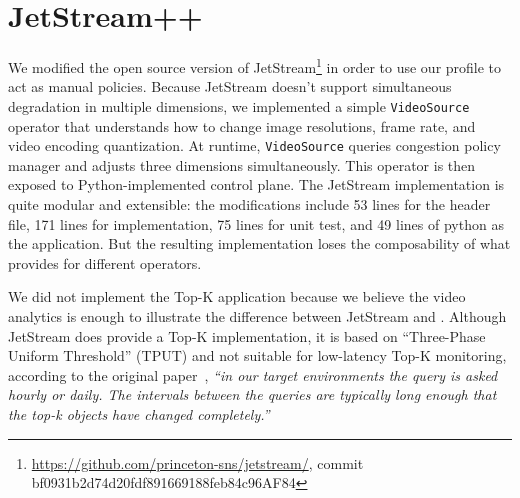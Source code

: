 \section{JetStream++}
\label{appendix:jetstream++}

We modified the open source version of
JetStream\footnote{\url{https://github.com/princeton-sns/jetstream/}, commit
  bf0931b2d74d20fdf891669188feb84c96AF84} in order to use our profile to act as
manual policies. Because JetStream doesn't support simultaneous degradation in
multiple dimensions, we implemented a simple \texttt{VideoSource} operator that
understands how to change image resolutions, frame rate, and video encoding
quantization. At runtime, \texttt{VideoSource} queries congestion policy manager
and adjusts three dimensions simultaneously. This operator is then exposed to
Python-implemented control plane. The JetStream implementation is quite modular
and extensible: the modifications include 53 lines for the header file, 171
lines for implementation, 75 lines for unit test, and 49 lines of python as the
application. But the resulting implementation loses the composability of what
\sysname{} provides for different operators.

We did not implement the Top-K application because we believe the video
analytics is enough to illustrate the difference between JetStream and
\sysname{}. Although JetStream does provide a Top-K implementation, it is based
on ``Three-Phase Uniform Threshold'' (TPUT) and not suitable for low-latency
Top-K monitoring, according to the original paper~\cite{cao2004efficient},
\textit{``in our target environments the query is asked hourly or daily. The
  intervals between the queries are typically long enough that the top-k objects
  have changed completely.''}


